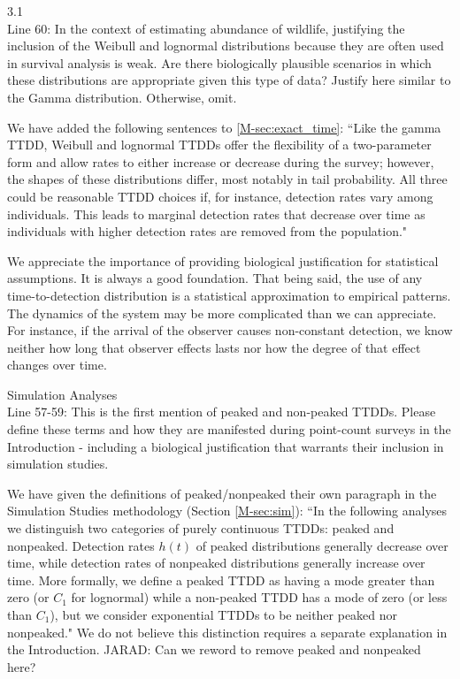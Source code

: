 \documentclass[12pt]{article}
\renewenvironment{quote}  %
              {\list{}{\rightmargin\leftmargin}\normalfont%
               \item\relax}
              {\endlist}
\newcommand{\jarad}[1]{{\color{Orange} JARAD: #1}}
\begin{document}
3.1 \\
Line 60: In the context of estimating abundance of wildlife, justifying the inclusion of the Weibull and lognormal distributions because they are often used in survival analysis is weak.  Are there biologically plausible scenarios in which these distributions are appropriate given this type of data?  Justify here similar to the Gamma distribution.  Otherwise, omit.
\begin{quote}
We have added the following sentences to \ref{M-sec:exact_time}: ``Like the gamma TTDD, Weibull and lognormal TTDDs offer the flexibility of a two-parameter form and allow rates to either increase or decrease during the survey; however, the shapes of these distributions differ, most notably in tail probability.
All three could be reasonable TTDD choices if, for instance, detection rates vary among individuals.
This leads to marginal detection rates that decrease over time as individuals with higher detection rates are removed from the population."

We appreciate the importance of providing biological justification for statistical assumptions.
It is always a good foundation.
That being said, the use of any time-to-detection distribution is a statistical approximation to empirical patterns.
The dynamics of the system may be more complicated than we can appreciate.
For instance, if the arrival of the observer causes non-constant detection, we know neither how long that observer effects lasts nor how the degree of that effect changes over time.
\end{quote}

Simulation Analyses\\
Line 57-59: This is the first mention of peaked and non-peaked TTDDs.  Please define these terms and how they are manifested during point-count surveys in the Introduction - including a biological justification that warrants their inclusion in simulation studies.
\begin{quote}
We have given the definitions of peaked/nonpeaked their own paragraph in the Simulation Studies methodology (Section \ref{M-sec:sim}):
``In the following analyses we distinguish two categories of purely continuous TTDDs: peaked and nonpeaked.  
Detection rates $h(t)$ of peaked distributions generally decrease over time, while detection rates of nonpeaked distributions generally increase over time.
More formally, we define a peaked TTDD as having a mode greater than zero (or $C_1$ for lognormal) while a non-peaked TTDD has a mode of zero (or less than $C_1$), but we consider exponential TTDDs to be neither peaked nor nonpeaked."
We do not believe this distinction requires a separate explanation in the Introduction.
\jarad{Can we reword to remove peaked and nonpeaked here?}
\end{quote}
\end{document}
